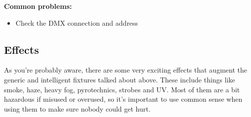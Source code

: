 \documentclass[14pt]{article} %
\let\Oldsubsection\subsection
\renewcommand{\subsection}{\FloatBarrier\Oldsubsection}
\begin{document}
\textbf{Common problems:}
\begin{itemize}
\item	Check the DMX connection and address
\end{itemize}

\subsection{Effects}

As you're probably aware, there are some very exciting effects that augment the generic and intelligent fixtures talked about above. These include things like smoke, haze, heavy fog, pyrotechnics, strobes and UV. Most of them are a bit hazardous if misused or overused, so it's important to use common sense when using them to make sure nobody could get hurt.
\end{document}
